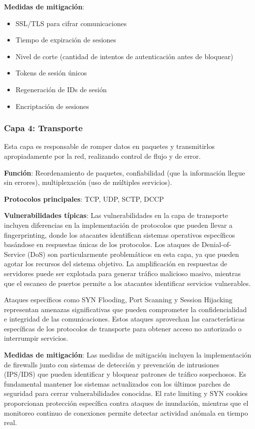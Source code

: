 \begin{itemize}
\textbf{Medidas de mitigación}:
\begin{itemize}
    \item SSL/TLS para cifrar comunicaciones
    \item Tiempo de expiración de sesiones
    \item Nivel de corte (cantidad de intentos de autenticación antes de bloquear)
    \item Tokens de sesión únicos
    \item Regeneración de IDs de sesión
    \item Encriptación de sesiones
\end{itemize}

\subsubsection{Capa 4: Transporte}

Esta capa es responsable de romper datos en paquetes y transmitirlos apropiadamente por la red, realizando control de flujo y de error.

\textbf{Función}: Reordenamiento de paquetes, confiabilidad (que la información llegue sin errores), multiplexación (uso de múltiples servicios).

\textbf{Protocolos principales}: TCP, UDP, SCTP, DCCP

\textbf{Vulnerabilidades típicas}:
Las vulnerabilidades en la capa de transporte incluyen diferencias en la implementación de protocolos que pueden llevar a fingerprinting, donde los atacantes identifican sistemas operativos específicos basándose en respuestas únicas de los protocolos. Los ataques de Denial-of-Service (DoS) son particularmente problemáticos en esta capa, ya que pueden agotar los recursos del sistema objetivo. La amplificación en respuestas de servidores puede ser explotada para generar tráfico malicioso masivo, mientras que el escaneo de puertos permite a los atacantes identificar servicios vulnerables.

Ataques específicos como SYN Flooding, Port Scanning y Session Hijacking representan amenazas significativas que pueden comprometer la confidencialidad e integridad de las comunicaciones. Estos ataques aprovechan las características específicas de los protocolos de transporte para obtener acceso no autorizado o interrumpir servicios.

\textbf{Medidas de mitigación}:
Las medidas de mitigación incluyen la implementación de firewalls junto con sistemas de detección y prevención de intrusiones (IPS/IDS) que pueden identificar y bloquear patrones de tráfico sospechosos. Es fundamental mantener los sistemas actualizados con los últimos parches de seguridad para cerrar vulnerabilidades conocidas. El rate limiting y SYN cookies proporcionan protección específica contra ataques de inundación, mientras que el monitoreo continuo de conexiones permite detectar actividad anómala en tiempo real.


\end{itemize}
